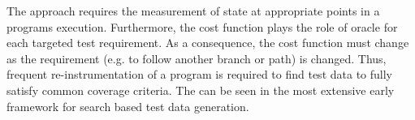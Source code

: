 The approach requires the measurement of state at appropriate points in a programs execution. Furthermore, the cost function plays the role of oracle for each targeted test requirement. As a consequence, the cost function must change as the requirement (e.g. to follow another branch or path) is changed. Thus, frequent re-instrumentation of a program is required to find test data to fully satisfy common coverage criteria. The can be seen in the most extensive early framework for search based test data generation.







